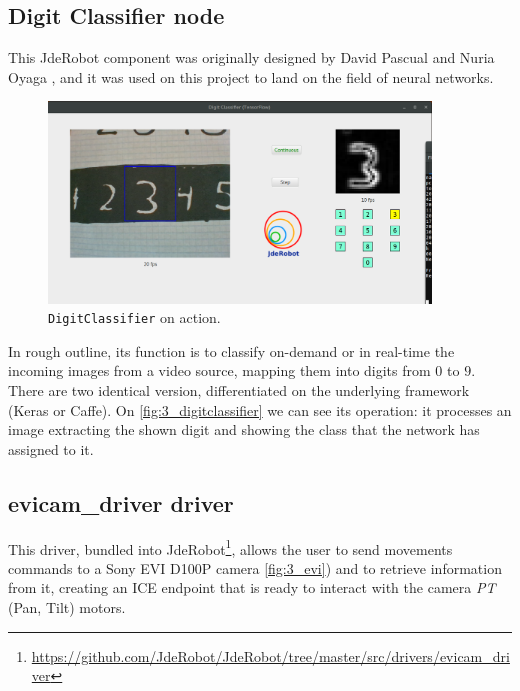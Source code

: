 	\subsection{Digit Classifier node}
	\label{sec:3_digitclassifier_jderobot}
		This JdeRobot component was originally designed by David Pascual \cite{dpascualhe} and Nuria Oyaga \cite{noyaga}, and it was used on this project to land on the field of neural networks.\\
		\begin{figure}[h]
			\centering
			\includegraphics[width=4in]{images/digitclassifier}
			\caption{\texttt{DigitClassifier} on action.}
			\label{fig:3_digitclassifier}
		\end{figure}
		
		
		In rough outline, its function is to classify on-demand or in real-time the incoming images from a video source, mapping them into digits from $0$ to $9$. There are two identical version, differentiated on the underlying framework (Keras or Caffe). On \autoref{fig:3_digitclassifier} we can see its operation: it processes an image extracting the shown digit and showing the class that the network has assigned to it.\\
	
	
	\subsection{evicam\_driver driver}
	\label{sec:3_evicam_driver}
	This driver, bundled into JdeRobot\footnote{\url{https://github.com/JdeRobot/JdeRobot/tree/master/src/drivers/evicam\_driver}}, allows the user to send movements commands to a Sony EVI D100P camera \autoref{fig:3_evi}) and to retrieve information from it, creating an ICE endpoint that is ready to interact with the camera \emph{PT} (Pan, Tilt) motors.\\
	
